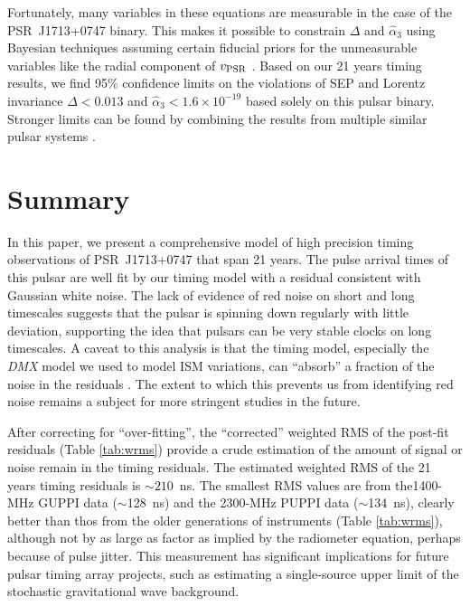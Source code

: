 Fortunately, many variables in these equations are measurable in the
case of the PSR~J1713+0747 binary. This makes it possible to constrain $\Delta$
and $\hat{\alpha}_3$ using Bayesian techniques assuming certain fiducial
priors for the unmeasurable variables like the radial component of
$v_{\rm PSR}$ \citep{sns+05, sfl+05, gsf+11}. Based on our 21 years 
timing results, we find 95\% confidence limits on the violations of SEP and
Lorentz invariance $\Delta < 0.013$ and
$\hat{\alpha}_3<1.6\times10^{-19}$ based solely on this pulsar
binary.  Stronger limits can be found by combining the results from
multiple similar pulsar systems \citep{wex00,sfl+05, gsf+11}.


\section{Summary}
In this paper, we present a comprehensive model of high precision timing observations of
PSR~J1713+0747 that span 21 years. 
The pulse arrival times of this pulsar are well fit by our timing model with a
residual consistent with Gaussian white noise.
The lack of evidence of red noise on short and long timescales suggests that
the pulsar is spinning down regularly with little deviation, supporting the
idea that pulsars can be very stable clocks on long timescales.
A caveat to this analysis is that the timing model, especially the
\textit{DMX} model we used to model ISM variations, can ``absorb'' a fraction
of the noise in the residuals \citep{kcs+13}. The extent to which this prevents us from
identifying red noise remains a subject for more stringent studies in the
future.

After correcting for ``over-fitting'', the ``corrected'' weighted RMS of the post-fit residuals (Table \ref{tab:wrms}) provide a crude estimation of
the amount of signal or noise remain in the timing residuals. The estimated
weighted RMS of the 21 years timing residuals is $\sim 210$~ns. The smallest
RMS values are from the1400-MHz GUPPI data ($\sim$128~ns) and the
2300-MHz PUPPI data ($\sim$134~ns),
clearly better than thos from the older generations of instruments 
(Table \ref{tab:wrms}), although not by as large as factor as implied
by the radiometer equation, perhaps because of pulse jitter. 
This measurement has significant implications for future pulsar timing array
projects, such as estimating a single-source
upper limit of the stochastic gravitational wave background.


